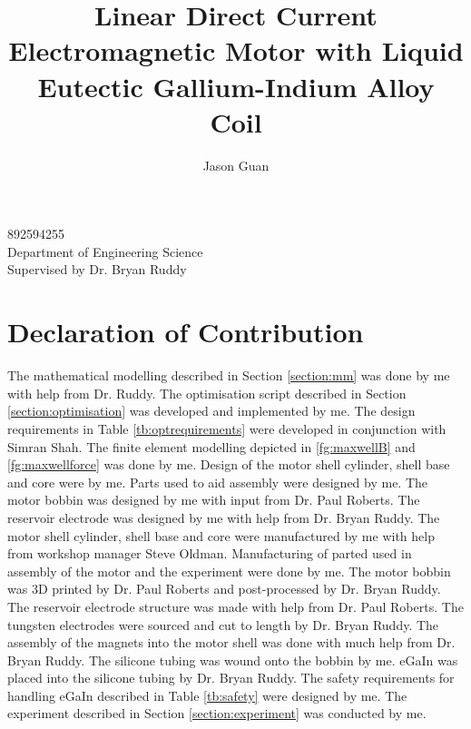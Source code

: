 \documentclass[a4paper,12pt]{article}
\title{Linear Direct Current Electromagnetic Motor with Liquid Eutectic Gallium-Indium Alloy Coil}
\author{Jason Guan}
\begin{document}
\maketitle
\begin{center}
    892594255\\
    Department of Engineering Science\\
    Supervised by Dr. Bryan Ruddy
\end{center}
\thispagestyle{empty}

\newpage

\section*{Declaration of Contribution}
    The mathematical modelling described in Section \ref{section:mm} was done by me with help from Dr. Ruddy. The optimisation script described in Section \ref{section:optimisation} was developed and implemented by me. The design requirements in Table \ref{tb:optrequirements} were developed in conjunction with Simran Shah. The finite element modelling depicted in \ref{fg:maxwellB} and \ref{fg:maxwellforce} was done by me. Design of the motor shell cylinder, shell base and core were by me. Parts used to aid assembly were designed by me. The motor bobbin was designed by me with input from Dr. Paul Roberts. The reservoir electrode was designed by me with help from Dr. Bryan Ruddy. The motor shell cylinder, shell base and core were manufactured by me with help from workshop manager Steve Oldman. Manufacturing of parted used in assembly of the motor and the experiment were done by me. The motor bobbin was 3D printed by Dr. Paul Roberts and post-processed by Dr. Bryan Ruddy. The reservoir electrode structure was made with help from Dr. Paul Roberts. The tungsten electrodes were sourced and cut to length by Dr. Bryan Ruddy. The assembly of the magnets into the motor shell was done with much help from Dr. Bryan Ruddy. The silicone tubing was wound onto the bobbin by me. eGaIn was placed into the silicone tubing by Dr. Bryan Ruddy. The safety requirements for handling eGaIn described in Table \ref{tb:safety} were designed by me. The experiment described in Section \ref{section:experiment} was conducted by me.
\newpage
\end{document}
